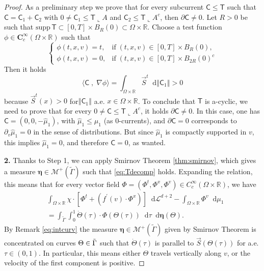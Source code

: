 \documentclass[11pt, twoside, reqno]{amsart}
\theoremstyle{definition}
\theoremstyle{remark}
\numberwithin{equation}{section}
\newcommand*\dif{\mathop{}\!\mathrm{d}}
\newcommand{\mc}[1]{\mathcal{#1}}
\newcommand{\mr}[1]{\mathrm{#1}}
\newcommand{\ms}[1]{\mathsf{#1}}
\newcommand{\wt}[1]{\widetilde{#1}}
\begin{document}
\begin{proof}
As a preliminary step we prove that for every subcurrent $\ms C \leq \ms T$ such that $\ms C = \ms C_1 + \ms C_2$ with $0 \neq \ms C_1 \leq \ms T\llcorner A$ and $\ms C_2 \leq \ms T\llcorner A^c$, then $\partial \ms C \neq 0$. Let $R > 0$ be such that  $\mr{supp}\, \ms T \subset [0, T] \times B_R(0)\subset \Omega \times \mathbb R$.  Choose a test function $\phi \in \mathbf
 C^{\infty}_c(\Omega \times \mathbb R)$ such that
$$
\begin{cases}
\phi(t, x, v) = t, &  \text{if} \; (t, x, v) \in [0,T] \times B_R(0), \\
\phi(t, x, v) = 0, & \text{if}\; (t, x, v) \in  [0,T] \times B_{2R}(0)^c
\end{cases}
$$
Then it holds
$$
\langle \ms C \; , \; \nabla \phi \rangle = \int_{\Omega \times \mathbb R} \vec S^t\dif \left\Vert \ms C_1\right\Vert  >0
$$
because $\vec S^t(x) > 0$ for$\left\Vert \ms C_1\right\Vert$ a.e. $x \in \Omega \times \mathbb R$. To conclude that $\ms T$ is a-cyclic, we need to prove that for every $0 \neq \ms C \leq \ms T\llcorner A^c$, it holds $\partial \ms C \neq 0$. In this case, one has $\ms C = (0, 0, -\hat \mu_1)$, with $\hat \mu_1  \leq \mu_1$ (as $0$-currents), and $\partial \ms C = 0$ corresponds to $\partial_v \hat \mu_1 = 0$ in the sense of distributions. But since $\hat \mu_1$ is compactly supported in $v$, this implies $\hat \mu_1 = 0$, and therefore $\ms C = 0$, as wanted.

\vspace{0.3cm}
 \textbf{2.}  Thanks to Step 1, we can apply Smirnov Theorem \ref{thm:smirnov}, which gives a measure $\boldsymbol{\eta}\in \mathscr M^+(\wt \Gamma)$ such that \eqref{eq:Tdecomp} holds. Expanding the relation, this means that for every vector field $\Phi = (\Phi^t, \Phi^x, \Phi^v) \in C^\infty_c(\Omega \times \mathbb R)$, we have
\begin{equation}
    \begin{aligned}
   & \int_{\Omega \times \mathbb R}\chi \cdot [ \Phi^t + (f^{\prime}(v)\cdot \Phi^x ) ] \dif \mc L^{d+2}  -\int_{\Omega \times \mathbb R} \Phi^{v} \dif \mu_1 \\
   & = \int_{\wt \Gamma} \int_0^1 \dot\Theta(\tau) \cdot \Phi(\Theta(\tau))\dif \tau \dif \boldsymbol{\eta}(\Theta).
    \end{aligned}
\end{equation}
By Remark \ref{eq:intcurv} the  measure $\boldsymbol{\eta} \in \mathscr M^+(\wt \Gamma)$ given by Smirnov Theorem is concentrated on curves $\Theta \in \Tilde{ \Gamma}$ such that $\dot\Theta(\tau)$ is parallel to $\vec S(\Theta(\tau))$ for a.e. $\tau \in (0, 1)$. In particular, this means either $\Theta$ travels vertically along $v$, or the velocity of the first component is positive.


\end{proof}
\end{document}

